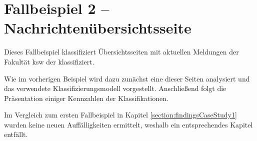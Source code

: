 \section{Fallbeispiel 2 -- Nachrichtenübersichtsseite}
    Dieses Fallbeispiel klassifiziert Übersichtsseiten mit aktuellen
    Meldungen der Fakultät \gls{ksw} der {\fernUni} klassifiziert.

    Wie im vorherigen Beispiel wird dazu zunächst eine dieser Seiten analysiert
    und das verwendete Klassifizierungsmodell vorgestellt.
    Anschließend folgt die Präsentation einiger Kennzahlen der Klassifikationen.

    Im Vergleich zum ersten Fallbeispiel in Kapitel \ref{section:findingsCaseStudy1}
    wurden keine neuen Auffälligkeiten ermittelt,
    weshalb ein entsprechendes Kapitel entfällt.

    
    
    
